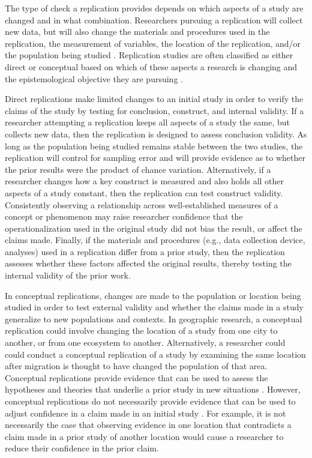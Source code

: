 \documentclass[]{interact}
\theoremstyle{plain}%
\theoremstyle{definition}
\theoremstyle{remark}
\begin{document}
The type of check a replication provides depends on which aspects of a study are changed and in what combination. 
Researchers pursuing a replication will collect new data, but will also change the materials and procedures used in the replication, the measurement of variables, the location of the replication, and/or the population being studied \citep{hendrick1990, schmidt2009, gomez2010replications}. 
Replication studies are often classified as either direct or conceptual based on which of these aspects a research is changing and the epistemological objective they are pursuing \citep[see][]{sargent1981repeatability, schmidt2009, plesser2018reproducibility}.

Direct replications make limited changes to an initial study in order to verify the claims of the study by testing for conclusion, construct, and internal validity. 
If a researcher attempting a replication keeps all aspects of a study the same, but collects new data, then the replication is designed to assess conclusion validity.
As long as the population being studied remains stable between the two studies, the replication will control for sampling error and will provide evidence as to whether the prior results were the product of chance variation. 
Alternatively, if a researcher changes how a key construct is measured and also holds all other aspects of a study constant, then the replication can test construct validity.
Consistently observing a relationship across well-established measures of a concept or phenomenon may raise researcher confidence that the operationalization used in the original study did not bias the result, or affect the claims made. 
Finally, if the materials and procedures (e.g., data collection device, analyses) used in a replication differ from a prior study, then the replication assesses whether these factors affected the original results, thereby testing the internal validity of the prior work. 

In conceptual replications, changes are made to the population or location being studied in order to test external validity and whether the claims made in a study generalize to new populations and contexts. 
In geographic research, a conceptual replication could involve changing the location of a study from one city to another, or from one ecosystem to another. 
Alternatively, a researcher could could conduct a conceptual replication of a study by examining the same location after migration is thought to have changed the population of that area. 
Conceptual replications provide evidence that can be used to assess the hypotheses and theories that underlie a prior study in new situations \citep{schmidt2009}.
However, conceptual replications do not necessarily provide evidence that can be used to adjust confidence in a claim made in an initial study \citep{nosek2020}.
For example, it is not necessarily the case that observing evidence in one location that contradicts a claim made in a prior study of another location would cause a researcher to reduce their confidence in the prior claim.
\end{document}
